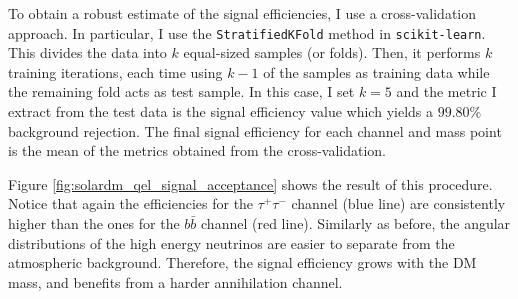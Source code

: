 To obtain a robust estimate of the signal efficiencies, I use a cross-validation approach. In particular, I use the \texttt{StratifiedKFold} method in \texttt{scikit-learn}. This divides the data into $k$ equal-sized samples (or folds). Then, it performs $k$ training iterations, each time using $k-1$ of the samples as training data while the remaining fold acts as test sample. In this case, I set $k=5$ and the metric I extract from the test data is the signal efficiency value which yields a $99.80\%$ background rejection. The final signal efficiency for each channel and mass point is the mean of the metrics obtained from the cross-validation.

Figure \ref{fig:solardm_qel_signal_acceptance} shows the result of this procedure. Notice that again the efficiencies for the $\tau^{+}\tau^{-}$ channel (blue line) are consistently higher than the ones for the $b\bar{b}$ channel (red line). Similarly as before, the angular distributions of the high energy neutrinos are easier to separate from the atmospheric background. Therefore, the signal efficiency grows with the DM mass, and benefits from a harder annihilation channel.

